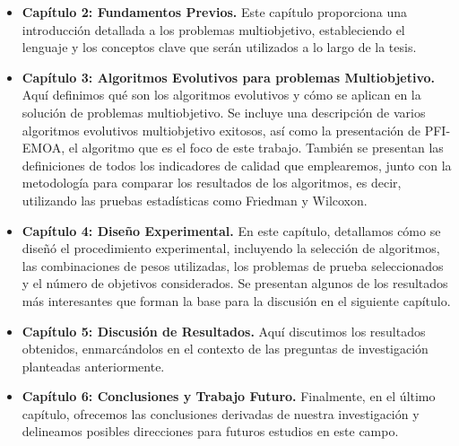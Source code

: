 \begin{itemize}
    \item \textbf{Capítulo 2: Fundamentos Previos.} Este capítulo proporciona una introducción detallada a los problemas multiobjetivo, estableciendo el lenguaje y los conceptos clave que serán utilizados a lo largo de la tesis.
    \item \textbf{Capítulo 3: Algoritmos Evolutivos para problemas Multiobjetivo.} Aquí definimos qué son los algoritmos evolutivos y cómo se aplican en la solución de problemas multiobjetivo. Se incluye una descripción de varios algoritmos evolutivos multiobjetivo exitosos, así como la presentación de PFI-EMOA, el algoritmo que es el foco de este trabajo. También se presentan las definiciones de todos los indicadores de calidad que emplearemos, junto con la metodología para comparar los resultados de los algoritmos, es decir, utilizando las pruebas estadísticas como Friedman y Wilcoxon.
    \item \textbf{Capítulo 4: Diseño Experimental.} En este capítulo, detallamos cómo se diseñó el procedimiento experimental, incluyendo la selección de algoritmos, las combinaciones de pesos utilizadas, los problemas de prueba seleccionados y el número de objetivos considerados. Se presentan algunos de los resultados más interesantes que forman la base para la discusión en el siguiente capítulo.
    \item \textbf{Capítulo 5: Discusión de Resultados.} Aquí discutimos los resultados obtenidos, enmarcándolos en el contexto de las preguntas de investigación planteadas anteriormente.
    \item \textbf{Capítulo 6: Conclusiones y Trabajo Futuro.} Finalmente, en el último capítulo, ofrecemos las conclusiones derivadas de nuestra investigación y delineamos posibles direcciones para futuros estudios en este campo.
\end{itemize}




